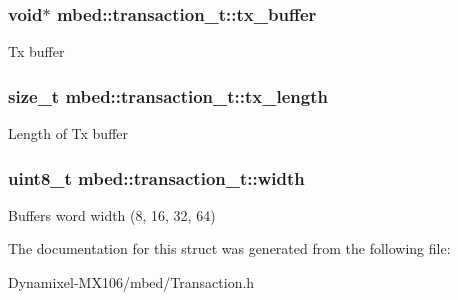 \subsubsection[{\texorpdfstring{tx\+\_\+buffer}{tx_buffer}}]{\setlength{\rightskip}{0pt plus 5cm}void$\ast$ mbed\+::transaction\+\_\+t\+::tx\+\_\+buffer}\hypertarget{structmbed_1_1transaction__t_abacf8c4e26c5bee9e3f45abdb065a46c}{}\label{structmbed_1_1transaction__t_abacf8c4e26c5bee9e3f45abdb065a46c}
Tx buffer 
\subsubsection[{\texorpdfstring{tx\+\_\+length}{tx_length}}]{\setlength{\rightskip}{0pt plus 5cm}size\+\_\+t mbed\+::transaction\+\_\+t\+::tx\+\_\+length}\hypertarget{structmbed_1_1transaction__t_aa2251489b9b40afc9b6ee367d0c7746d}{}\label{structmbed_1_1transaction__t_aa2251489b9b40afc9b6ee367d0c7746d}
Length of Tx buffer 
\subsubsection[{\texorpdfstring{width}{width}}]{\setlength{\rightskip}{0pt plus 5cm}uint8\+\_\+t mbed\+::transaction\+\_\+t\+::width}\hypertarget{structmbed_1_1transaction__t_a07ac843f6ce2f59a3d65d7d8beac1f11}{}\label{structmbed_1_1transaction__t_a07ac843f6ce2f59a3d65d7d8beac1f11}
Buffer\textquotesingle{}s word width (8, 16, 32, 64) 

The documentation for this struct was generated from the following file\+:\begin{DoxyCompactItemize}
\item 
Dynamixel-\/\+M\+X106/mbed/Transaction.\+h\end{DoxyCompactItemize}
